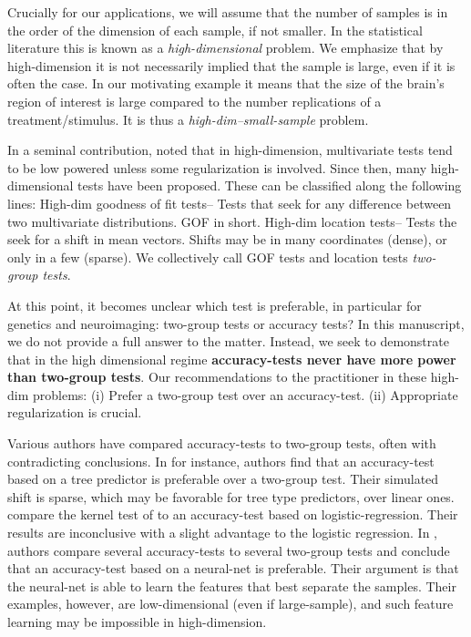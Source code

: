 \documentclass[oupdraft]{bio}
\begin{document}
Crucially for our applications, we will assume that the number of samples is in the order of the dimension of each sample, if not smaller. 
In the statistical literature this is known as a \emph{high-dimensional} problem. 
We emphasize that by high-dimension it is not necessarily implied that the sample is large, even if it is often the case. 
In our motivating example it means that the size of the brain's region of interest is large compared to the number replications of a treatment/stimulus. 
It is thus a \emph{high-dim--small-sample} problem. 

In a seminal contribution, \citet{bai1996effect} noted that in high-dimension, multivariate tests tend to be low powered unless some regularization is involved. 
Since then, many high-dimensional tests have been proposed. 
These can be classified along the following lines:
High-dim goodness of fit tests-- Tests that seek for any difference between two multivariate distributions. GOF in short.
High-dim location tests-- Tests the seek for a shift in mean vectors. 
Shifts may be in many coordinates (dense), or only in a few (sparse).
We collectively call GOF tests and location tests \emph{two-group tests}. 

At this point, it becomes unclear which test is preferable, in particular for genetics and neuroimaging: two-group tests or accuracy tests?
In this manuscript, we do not provide a full answer to the matter.
Instead, we seek to demonstrate that in the high dimensional regime \textbf{accuracy-tests never have more power than two-group tests}.
Our recommendations to the practitioner in these high-dim problems:
(i) Prefer a two-group test over an accuracy-test. 
(ii) Appropriate regularization is crucial. 

Various authors have compared accuracy-tests to two-group tests, often with contradicting conclusions.
In \cite{yu2007two} for instance, authors find that an accuracy-test based on a tree predictor is preferable over a two-group test. 
Their simulated shift is sparse, which may be favorable for tree type predictors, over linear ones. 
\citet{olivetti2013kernel} compare the kernel test of \cite{gretton_kernel_2012-1} to an accuracy-test based on logistic-regression.
Their results are inconclusive with a slight advantage to the logistic regression.
In \cite{lopez2016revisiting}, authors compare several accuracy-tests to several two-group tests and conclude that an accuracy-test based on a neural-net is preferable. 
Their argument is that the neural-net is able to learn the features that best separate the samples. 
Their examples, however, are low-dimensional (even if large-sample), and such feature learning may be impossible in high-dimension.
\end{document}
